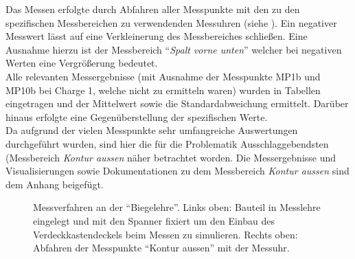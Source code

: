 \documentclass[12pt,a4paper,parskip,twoside,BCOR5mm,headsepline]{scrartcl}
\begin{document}
 
Das Messen erfolgte durch Abfahren aller Messpunkte mit den zu den spezifischen Messbereichen zu verwendenden Messuhren (siehe ). Ein negativer Messwert lässt auf eine Verkleinerung des Messbereiches schließen. Eine Ausnahme hierzu ist der Messbereich "`\emph{Spalt vorne unten}"' welcher  bei negativen Werten eine Vergrößerung bedeutet.\\
 Alle relevanten Messergebnisse (mit Ausnahme der Messpunkte MP1b und MP10b bei Charge 1, welche nicht zu ermitteln waren) wurden in Tabellen eingetragen und  der Mittelwert sowie die Standardabweichung
 ermittelt. Darüber hinaus erfolgte eine Gegenüberstellung der spezifischen Werte.\\
Da aufgrund der vielen Messpunkte  sehr umfangreiche Auswertungen durchgeführt wurden,  sind hier die für die Problematik Ausschlaggebendsten  (Messbereich \emph{Kontur aussen} näher betrachtet worden. Die Messergebnisse und Visualisierungen sowie Dokumentationen zu dem Messbereich \emph{Kontur aussen} sind dem Anhang beigefügt. 
\begin{figure}[hbtp]
\centering
\hfill
{}
\hfill
{}
\hfill
\caption{Messverfahren an der "`Biegelehre"'. Links oben: Bauteil in Messlehre eingelegt und mit den Spanner fixiert um den Einbau des Verdeckkastendeckels beim Messen zu simulieren. Rechts oben: Abfahren der Messpunkte "`Kontur aussen"' mit der Messuhr. }
\label{fig:messverfahren}
\end{figure}
\end{document}
